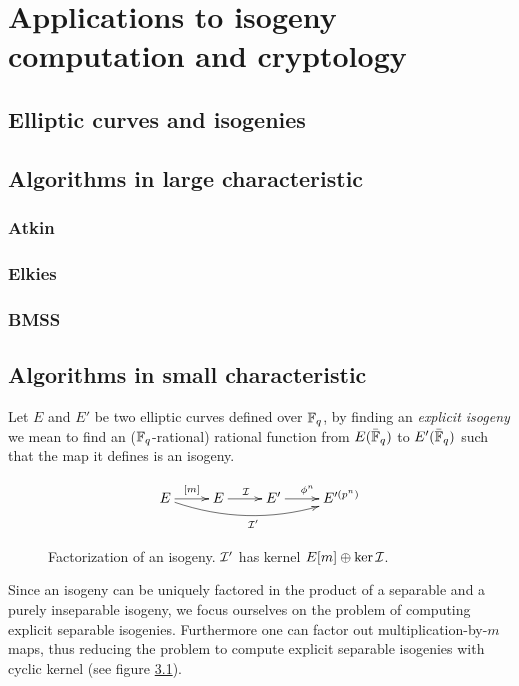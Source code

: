 \part{Applications to isogeny computation and cryptology}

\chapter{Elliptic curves and isogenies}



\chapter{Algorithms in large characteristic}
\section{Atkin}
\section{Elkies}
\section{BMSS}

\chapter{Algorithms in small characteristic}
\label{cha:algor-small-char}

Let $E$ and $E'$ be two elliptic curves defined over $\mathbb{F}_q$, by
finding an \emph{explicit isogeny} we mean to find an
($\mathbb{F}_q$-rational) rational function from $E(\bar{\mathbb{F}}_q)$ to
$E'(\bar{\mathbb{F}}_q)$ such that the map it defines is an isogeny.

\begin{figure}
  \centering
  \[\xymatrix{
    E \ar[r]^{[m]}\ar@/_1pc/[rrr]_{\I'} & E \ar[r]^\I & E' \ar[r]^{\frobisog^n} & E'^{(p^n)}\\
  }\]
  \label{fig:fact}
  \caption{Factorization of an isogeny. $\mathcal{I}'$ has kernel $E[m]\oplus\ker\mathcal{I}$.}
\end{figure}

Since an isogeny can be uniquely factored in the product of a
separable and a purely inseparable isogeny, we focus ourselves on the
problem of computing explicit separable isogenies. Furthermore one can
factor out multiplication-by-$m$ maps, thus reducing the problem to
compute explicit separable isogenies with cyclic kernel (see figure
\ref{fig:fact}).

